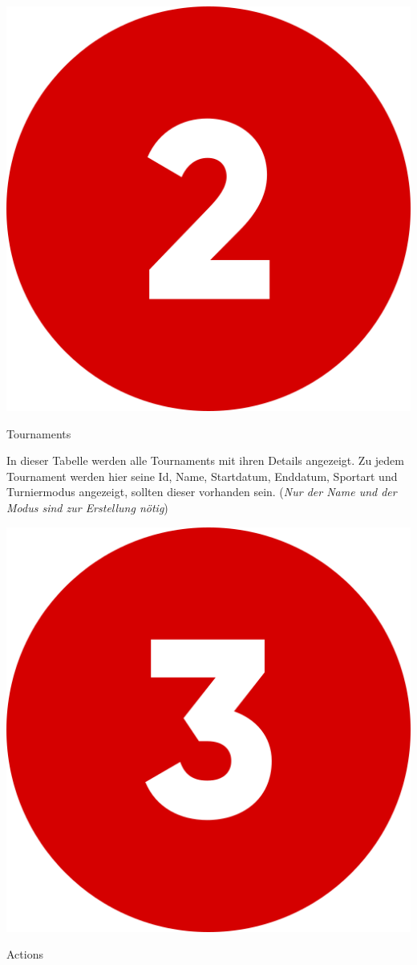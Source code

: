 \bigskip
\includegraphics[scale=0.05]{pics/user-guide/numbers/number-2.png} \begin{LARGE} Tournaments \end{LARGE}

In dieser Tabelle werden alle Tournaments mit ihren Details angezeigt. Zu jedem Tournament werden hier seine Id, Name, Startdatum, Enddatum, Sportart
und Turniermodus angezeigt, sollten dieser vorhanden sein. (\textit{Nur der Name und der Modus sind zur Erstellung nötig})


\bigskip
\includegraphics[scale=0.05]{pics/user-guide/numbers/number-3.png} \begin{LARGE} Actions \end{LARGE}

